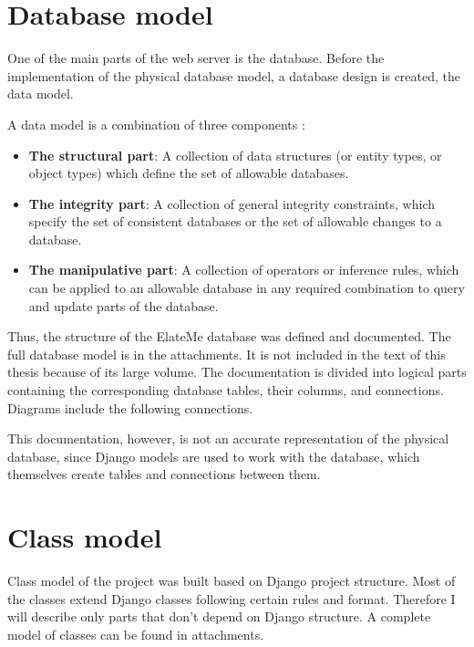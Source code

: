 \newcommand{\dbpart}[1]{
\item \textbf{#1}}
\section{Database model}
One of the main parts of the web server is the database. Before the implementation of the physical database model, a database design is created, the data model.

A data model is a combination of three components \cite{dbmodel}:

\begin{itemize}
\dbpart{The structural part}: A collection of data structures (or entity types, or object types) which define the set of allowable databases.
\dbpart{The integrity part}: A collection of general integrity constraints, which specify the set of consistent databases or the set of allowable changes to a database.
\dbpart{The manipulative part}: A collection of operators or inference rules, which can be applied to an allowable database in any required combination to query and update parts of the database.
\end{itemize}

Thus, the structure of the ElateMe database was defined and documented. The full database model is in the attachments. It is not included in the text of this thesis because of its large volume. The documentation is divided into logical parts containing the corresponding database tables, their columns, and connections. Diagrams include the following connections.


This documentation, however, is not an accurate representation of the physical database, since Django models are used to work with the database, which themselves create tables and connections between them.

\section{Class model}
Class model of the project was built based on Django project structure. Most of the classes extend Django classes following certain rules and format. Therefore I will describe only parts that don't depend on Django structure. A complete model of classes can be found in attachments.

